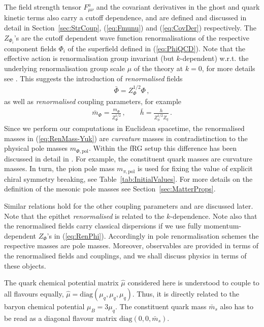 \documentclass[%
reprint,
superscriptaddress,
showpacs,preprintnumbers,
 amsmath,amssymb,
 aps,
prd,
]{revtex4-1}
\def\eq#1{(\ref{#1})}
\def\sec#1{Section~\ref{#1}}
\begin{document}
The field strength tensor $F^a_{\mu\nu}$ and the covariant derivatives
in the ghost and quark kinetic terms also carry a cutoff dependence,
and are defined and discussed in detail in \sec{sec:StrCoup},
\eq{eq:Fmunu} and \eq{eq:CovDer} respectively. The $Z_{\Phi_i}$'s are
the cutoff dependent wave function renormalisations of the respective
component fields $\Phi_i$ of the superfield defined in
\eq{eq:PhiQCD}. Note that the effective action is renormalisation
group invariant (but $k$-dependent) w.r.t. the underlying
renormalisation group scale $\mu$ of the theory at $k=0$, for more
details see \cite{Pawlowski:2005xe}. This suggests the introduction of
\textit{renormalised} fields
%
\begin{align}\label{eq:RenPhi}
  \bar \Phi = Z_{\Phi}^{1/2} \Phi\,,
\end{align}
%
as well as \textit{renormalised} coupling parameters, for example
%
\begin{align}\label{eq:RenMass-Yuk}
  \bar m_\Phi = \frac{m_\Phi}{Z^{1/2}_\Phi}\,, \quad \quad \bar h=
  \frac{h}{Z_\phi^{1/2} Z_q}\,.
\end{align}
%
Since we perform our computations in Euclidean spacetime, the
renormalised masses in \eq{eq:RenMass-Yuk} are \textit{curvature}
masses in contradistinction to the physical pole masses
$m_{\Phi,\textrm{pol}}$. Within the fRG setup this difference has been
discussed in detail in \cite{Helmboldt:2014iya}. For example, the
constituent quark masses are curvature masses. In turn, the pion pole
mass $m_{\pi,\textrm{pol}}$ is used for fixing the value of explicit
chiral symmetry breaking, see Table~\ref{tab:InitialValues}. For more
details on the definition of the mesonic pole masses see
\sec{sec:MatterProps}.

Similar relations hold for the other coupling parameters and are
discussed later. Note that the epithet \textit{renormalised} is
related to the $k$-dependence. Note also that the renormalised fields
carry classical dispersions if we use fully momentum-dependent
$Z_\Phi$'s in \eq{eq:RenPhi}. Accordingly in pole renormalisation
schemes the respective masses are pole masses. Moreover, observables
are provided in terms of the renormalised fields and couplings, and we
shall discuss physics in terms of these objects.

The quark chemical potential matrix $\hat \mu$ considered here is
understood to couple to all flavours equally,
$\hat\mu = \textrm{diag}(\mu_q, \mu_q, \mu_q)$. Thus, it is directly
related to the baryon chemical potential $\mu_B = 3 \mu_q$.  The
constituent quark mass $\bar m_s$ also has to be read as a diagonal
flavour matrix $\textrm{diag}(0,0,\bar m_s)$.
\end{document}

